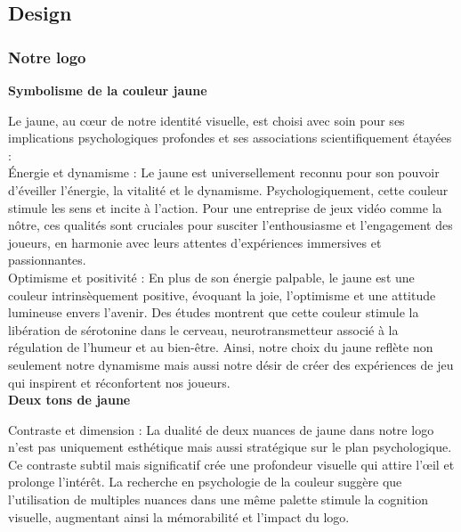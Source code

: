 
\subsection{Design}

\subsubsection{Notre logo}

\textbf{Symbolisme de la couleur jaune}
\vspace*{0.2cm}

Le jaune, au cœur de notre identité visuelle, est choisi avec soin pour ses implications psychologiques profondes et ses associations scientifiquement étayées :
\\

Énergie et dynamisme : Le jaune est universellement reconnu pour son pouvoir d'éveiller l'énergie, la vitalité et le dynamisme. Psychologiquement, cette couleur stimule les sens et incite à l'action. Pour une entreprise de jeux vidéo comme la nôtre, ces qualités sont cruciales pour susciter l'enthousiasme et l'engagement des joueurs, en harmonie avec leurs attentes d'expériences immersives et passionnantes.
\\

Optimisme et positivité : En plus de son énergie palpable, le jaune est une couleur intrinsèquement positive, évoquant la joie, l'optimisme et une attitude lumineuse envers l'avenir. Des études montrent que cette couleur stimule la libération de sérotonine dans le cerveau, neurotransmetteur associé à la régulation de l'humeur et au bien-être. Ainsi, notre choix du jaune reflète non seulement notre dynamisme mais aussi notre désir de créer des expériences de jeu qui inspirent et réconfortent nos joueurs.
\\

\textbf{Deux tons de jaune}
\vspace*{0.2cm}

Contraste et dimension : La dualité de deux nuances de jaune dans notre logo n'est pas uniquement esthétique mais aussi stratégique sur le plan psychologique. Ce contraste subtil mais significatif crée une profondeur visuelle qui attire l'œil et prolonge l'intérêt. La recherche en psychologie de la couleur suggère que l'utilisation de multiples nuances dans une même palette stimule la cognition visuelle, augmentant ainsi la mémorabilité et l'impact du logo.
\\

